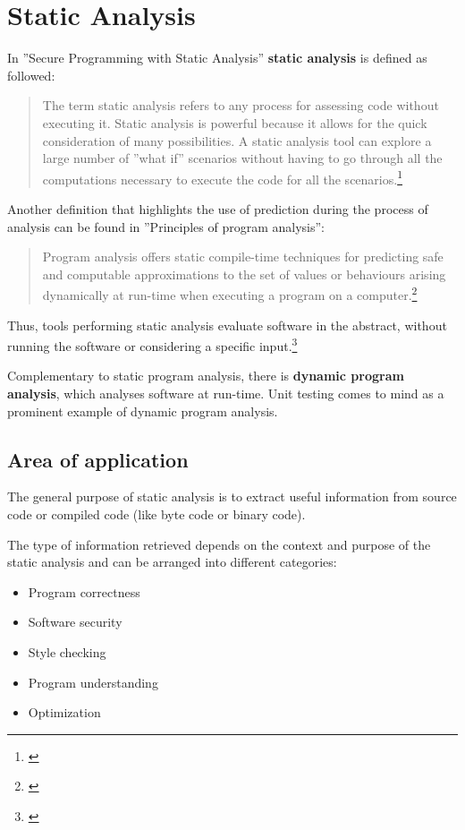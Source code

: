 \chapter{Static Analysis}

In ''Secure Programming with Static Analysis'' \textbf{static analysis} is defined as followed:

\begin{quotation}
The term static analysis refers to any process for assessing code without
executing it. Static analysis is powerful because it allows for the quick consideration of many possibilities. A static analysis tool can explore a large number of ''what if'' scenarios without having to go through all the computations
necessary to execute the code for all the scenarios.\footnote{\citep[3]{SecureProgramming}}
\end{quotation}

Another definition that highlights the use of prediction during the process of analysis can be found in ''Principles of program analysis'':

\begin{quotation}
Program analysis offers static compile-time techniques for predicting safe and computable approximations to the set of values or behaviours arising dynamically at run-time when executing a program on a computer.\footnote{\citep[1]{ProgramAnalysis}}
\end{quotation}

Thus, tools performing static analysis evaluate software in the abstract, without running the software or considering a specific input.\footnote{\citep[1]{UsingSAToFindBugs}}

Complementary to static program analysis, there is \textbf{dynamic program analysis}, which analyses software at run-time. Unit testing comes to mind as a prominent example of dynamic program analysis.

\newpage
\section{Area of application}

The general purpose of static analysis is to extract useful information from source code or compiled code (like byte code or binary code).

The type of information retrieved depends on the context and purpose of the static analysis and can be arranged into different categories:

\begin{itemize}\addtolength{\itemsep}{-0.5\baselineskip}
\item Program correctness
\item Software security
\item Style checking
\item Program understanding
\item Optimization
\end{itemize}

